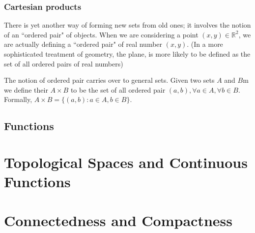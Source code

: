\subsubsection{Cartesian products}

There is yet another way of forming new sets from old ones; it involves the notion of an ``ordered pair" of objects. When we are considering a point $(x, y) \in \mathbb{R}^2$, we are actually defining a ``ordered pair" of real number $(x, y)$. (In a more sophisticated treatment of geometry, the plane, is more likely to be defined as the set of all ordered pairs of real numbers)

The notion of ordered pair carries over to general sets. Given two sets $A$ and $B$m we define their \textbf{} $A \times B$ to be the set of all ordered pair $(a, b), \forall a \in A, \forall b \in B$. Formally, $A \times B = \{(a, b): a \in A, b \in B\}$.


\subsection{Functions}





\section{Topological Spaces and Continuous Functions}

\section{Connectedness and Compactness}
